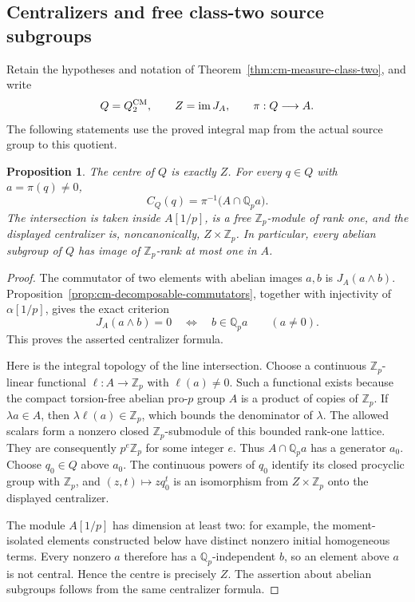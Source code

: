 \documentclass[11pt]{article}
\newtheorem{proposition}[theorem]{Proposition}
\theoremstyle{definition}\newtheorem{definition}[theorem]{Definition}
\begin{document}
\subsection{Centralizers and free class-two source subgroups}
\label{subsec:cm-class-two-subgroups}

Retain the hypotheses and notation of
Theorem~\ref{thm:cm-measure-class-two}, and write
\[
 Q=Q_2^{\rm CM},\qquad Z=\operatorname{im}J_A,
 \qquad \pi:Q\longrightarrow A.
\]
The following statements use the proved integral map from the
actual source group to this quotient.

\begin{proposition}\label{prop:cm-class-two-centralizers}
The centre of \(Q\) is exactly \(Z\).  For every \(q\in Q\)
with \(a=\pi(q)\ne0\),
\[
 C_Q(q)=\pi^{-1}\bigl(A\cap\mathbb Q_p a\bigr).
\]
The intersection is taken inside \(A[1/p]\), is a free
\(\mathbb Z_p\)-module of rank one, and the displayed
centralizer is, noncanonically, \(Z\times\mathbb Z_p\).
In particular, every abelian subgroup of \(Q\) has image
of \(\mathbb Z_p\)-rank at most one in \(A\).
\end{proposition}

\begin{proof}
The commutator of two elements with abelian images \(a,b\)
is \(J_A(a\wedge b)\).  Proposition~\ref{prop:cm-decomposable-commutators}, together
with injectivity of \(\alpha[1/p]\), gives the exact criterion
\[
 J_A(a\wedge b)=0\quad\Longleftrightarrow\quad
 b\in\mathbb Q_pa\qquad(a\ne0).
\]
This proves the asserted centralizer formula.

Here is the integral topology of the line intersection.
Choose a continuous \(\mathbb Z_p\)-linear functional
\(\ell:A\to\mathbb Z_p\) with \(\ell(a)\ne0\).
Such a functional exists because the compact torsion-free
abelian pro-\(p\) group \(A\) is a product of copies of
\(\mathbb Z_p\).  If \(\lambda a\in A\), then
\(\lambda\ell(a)\in\mathbb Z_p\), which bounds the
denominator of \(\lambda\).  The allowed scalars form a
nonzero closed \(\mathbb Z_p\)-submodule of this bounded
rank-one lattice.  They are consequently \(p^e\mathbb Z_p\)
for some integer \(e\).  Thus \(A\cap\mathbb Q_pa\)
has a generator \(a_0\).  Choose \(q_0\in Q\) above
\(a_0\).  The continuous powers of \(q_0\) identify
its closed procyclic group with \(\mathbb Z_p\), and
\((z,t)\mapsto zq_0^t\) is an isomorphism from
\(Z\times\mathbb Z_p\) onto the displayed centralizer.

The module \(A[1/p]\) has dimension at least two: for
example, the moment-isolated elements constructed below
have distinct nonzero initial homogeneous terms.
Every nonzero \(a\) therefore has a \(\mathbb Q_p\)-independent
\(b\), so an element above \(a\) is not central.
Hence the centre is precisely \(Z\).  The assertion about
abelian subgroups follows from the same centralizer formula.
\end{proof}
\end{document}

